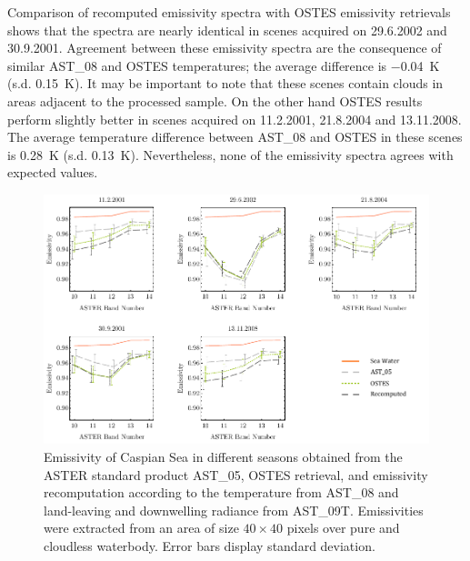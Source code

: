 Comparison of recomputed emissivity spectra with OSTES emissivity retrievals shows that the spectra are nearly identical in scenes acquired on 29.6.2002 and 30.9.2001. Agreement between these emissivity spectra are the consequence of similar AST\_08 and OSTES temperatures; the average difference is \SI{-0.04}{\kelvin} (s.d. \SI{0.15}{\kelvin}). It may be important to note that these scenes contain clouds in areas adjacent to the processed sample. On the other hand OSTES results perform slightly better in scenes acquired on 11.2.2001, 21.8.2004 and 13.11.2008. The average temperature difference between AST\_08 and OSTES in these scenes is \SI{0.28}{\kelvin} (s.d. \SI{0.13}{\kelvin}). Nevertheless, none of the emissivity spectra agrees with expected values.

\begin{figure}[!t]
\centering
\includegraphics[width=0.98\linewidth]{pics/Chapter_04/Caspian.pdf}
\vspace{1.5 em}
\caption{Emissivity of Caspian Sea in different seasons obtained from the ASTER standard product AST\_05, OSTES retrieval, and emissivity recomputation according to the temperature from AST\_08 and land-leaving and downwelling radiance from AST\_09T. Emissivities were extracted from an area of size $40 \times 40$ pixels over pure and cloudless waterbody. Error bars display standard deviation.}
\label{fig:CaspianSeaEmissivity}
\end{figure}

